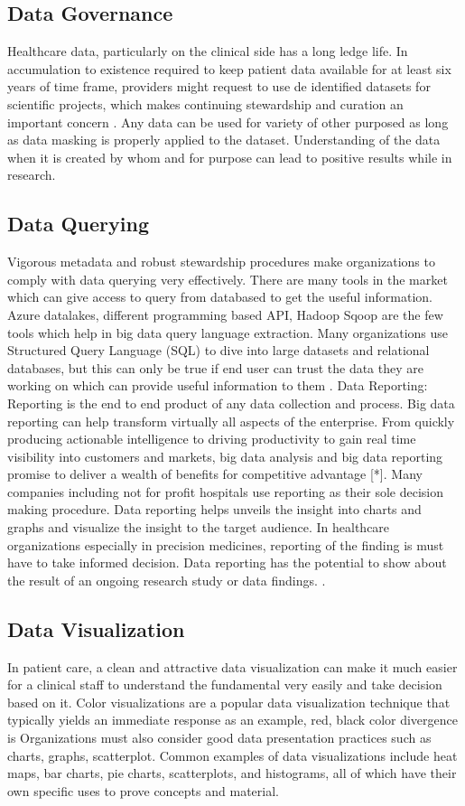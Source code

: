 \documentclass[sigconf]{acmart}
\begin{document}
\subsection{Data Governance} Healthcare data, particularly on the clinical side has a long ledge life.  In accumulation to existence required to keep patient data available for at least six years of time frame, providers might request to use de identified datasets for scientific projects, which makes continuing stewardship and curation an important concern \cite{editor05}.  Any data can be used for variety of other purposed as long as data masking is properly applied to the dataset. Understanding of the data when it is created by whom and for purpose can lead to positive results while in research. 

\subsection{Data Querying}
Vigorous metadata and robust stewardship procedures make organizations to comply with data querying very effectively. There are many tools in the market which can give access to query from databased to get the useful information. Azure datalakes, different programming based API, Hadoop Sqoop are the few tools which help in big data query language extraction.
Many organizations use Structured Query Language (SQL) to dive into large datasets and relational databases, but this can only be true if end user can trust the data they are working on which can provide useful information to them \cite{editor05}.
Data Reporting: Reporting is the end to end product of any data collection and process. Big data reporting can help transform virtually all aspects of the enterprise. From quickly producing actionable intelligence to driving productivity to gain real time visibility into customers and markets, big data analysis and big data reporting promise to deliver a wealth of benefits for competitive advantage [*]. Many companies including not for profit hospitals use reporting as their sole decision making procedure. Data reporting helps unveils the insight into charts and graphs and visualize the insight to the target audience. In healthcare organizations especially in precision medicines, reporting of the finding is must have to take informed decision. Data reporting has the potential to show about the result of an ongoing research study or data findings. \cite{editor05}.

\subsection{Data Visualization}
In patient care, a clean and attractive data visualization can make it much easier for a clinical staff to understand the fundamental very easily and take decision based on it. 
Color visualizations are a popular data visualization technique that typically yields an immediate response as an example, red, black color divergence is Organizations must also consider good data presentation practices such as charts, graphs, scatterplot. Common examples of data visualizations include heat maps, bar charts, pie charts, scatterplots, and histograms, all of which have their own specific uses to prove concepts and material.
\end{document}
